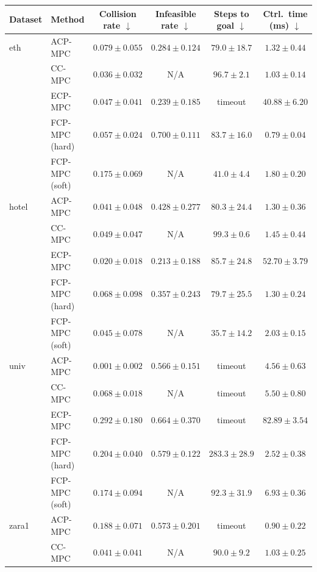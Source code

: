 \begin{tabular}{llcccc}
\hline
Dataset & Method & Collision rate $\downarrow$ & Infeasible rate $\downarrow$ & Steps to goal $\downarrow$ & Ctrl.\ time (ms) $\downarrow$ \\
\hline
eth & ACP-MPC~\cite{dixit2023adaptive} & $0.079\pm0.055$ & $0.284\pm0.124$ & $79.0\pm18.7$ & $1.32\pm0.44$ \\
 & CC-MPC~\cite{lekeufack2024decision} & $\mathbf{0.036}\pm0.032$ & N/A & $96.7\pm2.1$ & $1.03\pm0.14$ \\
 & ECP-MPC~\cite{shin2025egocentric} & $0.047\pm0.041$ & $\mathbf{0.239}\pm0.185$ & timeout & $40.88\pm6.20$ \\
 & FCP-MPC (hard) & $0.057\pm0.024$ & $0.700\pm0.111$ & $83.7\pm16.0$ & $\mathbf{0.79}\pm0.04$ \\
 & FCP-MPC (soft) & $0.175\pm0.069$ & N/A & $\mathbf{41.0}\pm4.4$ & $1.80\pm0.20$ \\
\hline
hotel & ACP-MPC~\cite{dixit2023adaptive} & $0.041\pm0.048$ & $0.428\pm0.277$ & $80.3\pm24.4$ & $1.30\pm0.36$ \\
 & CC-MPC~\cite{lekeufack2024decision} & $0.049\pm0.047$ & N/A & $99.3\pm0.6$ & $1.45\pm0.44$ \\
 & ECP-MPC~\cite{shin2025egocentric} & $\mathbf{0.020}\pm0.018$ & $\mathbf{0.213}\pm0.188$ & $85.7\pm24.8$ & $52.70\pm3.79$ \\
 & FCP-MPC (hard) & $0.068\pm0.098$ & $0.357\pm0.243$ & $79.7\pm25.5$ & $\mathbf{1.30}\pm0.24$ \\
 & FCP-MPC (soft) & $0.045\pm0.078$ & N/A & $\mathbf{35.7}\pm14.2$ & $2.03\pm0.15$ \\
\hline
univ & ACP-MPC~\cite{dixit2023adaptive} & $\mathbf{0.001}\pm0.002$ & $\mathbf{0.566}\pm0.151$ & timeout & $4.56\pm0.63$ \\
 & CC-MPC~\cite{lekeufack2024decision} & $0.068\pm0.018$ & N/A & timeout & $5.50\pm0.80$ \\
 & ECP-MPC~\cite{shin2025egocentric} & $0.292\pm0.180$ & $0.664\pm0.370$ & timeout & $82.89\pm3.54$ \\
 & FCP-MPC (hard) & $0.204\pm0.040$ & $0.579\pm0.122$ & $283.3\pm28.9$ & $\mathbf{2.52}\pm0.38$ \\
 & FCP-MPC (soft) & $0.174\pm0.094$ & N/A & $\mathbf{92.3}\pm31.9$ & $6.93\pm0.36$ \\
\hline
zara1 & ACP-MPC~\cite{dixit2023adaptive} & $0.188\pm0.071$ & $0.573\pm0.201$ & timeout & $0.90\pm0.22$ \\
 & CC-MPC~\cite{lekeufack2024decision} & $\mathbf{0.041}\pm0.041$ & N/A & $90.0\pm9.2$ & $1.03\pm0.25$ \\

\end{tabular}
